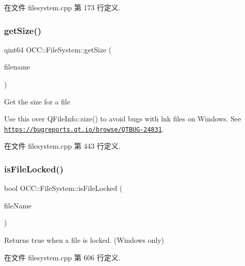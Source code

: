 在文件 filesystem.\+cpp 第 173 行定义.

\mbox{\label{namespace_o_c_c_1_1_file_system_a9da1655cd64b4fdd14eb745c05162fb8}} 
\subsubsection{\texorpdfstring{get\+Size()}{getSize()}}
{\footnotesize\ttfamily qint64 O\+C\+C\+::\+File\+System\+::get\+Size (\begin{DoxyParamCaption}\item[{const Q\+String \&}]{filename }\end{DoxyParamCaption})}



Get the size for a file 

Use this over Q\+File\+Info\+::size() to avoid bugs with lnk files on Windows. See \href{https://bugreports.qt.io/browse/QTBUG-24831}{\tt https\+://bugreports.\+qt.\+io/browse/\+Q\+T\+B\+U\+G-\/24831}. 

在文件 filesystem.\+cpp 第 443 行定义.

\mbox{\label{namespace_o_c_c_1_1_file_system_add336ce16ac7bb1cf6ac6cb3c77b44ec}} 
\subsubsection{\texorpdfstring{is\+File\+Locked()}{isFileLocked()}}
{\footnotesize\ttfamily bool O\+C\+C\+::\+File\+System\+::is\+File\+Locked (\begin{DoxyParamCaption}\item[{const Q\+String \&}]{file\+Name }\end{DoxyParamCaption})}

Returns true when a file is locked. (Windows only) 

在文件 filesystem.\+cpp 第 606 行定义.

\mbox{\label{namespace_o_c_c_1_1_file_system_a71e7eb587b2d6502e9d4b46746afb4b1}} 
